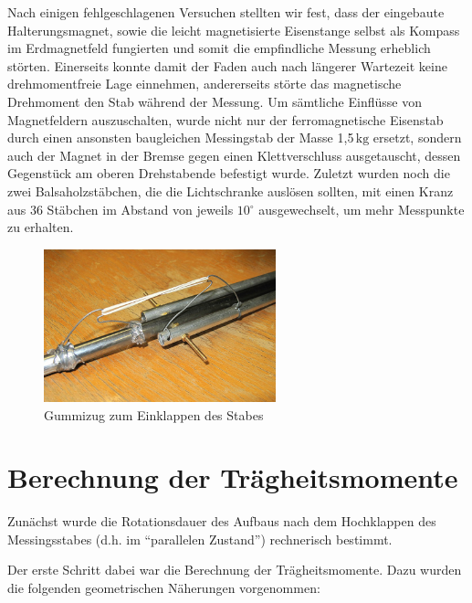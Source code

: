\documentclass[halfparskip, 11pt]{scrartcl}
\newcommand{\unit}[1]{\ensuremath{\,\mathrm{#1}}} %
\newcommand{\degr}{\ensuremath{^\circ}}
\begin{document}
Nach einigen fehlgeschlagenen Versuchen stellten wir fest, dass der eingebaute Halterungsmagnet, sowie die leicht magnetisierte Eisenstange selbst als Kompass im Erdmagnetfeld fungierten und somit die empfindliche Messung erheblich störten.
Einerseits konnte damit der Faden auch nach längerer Wartezeit keine drehmomentfreie Lage einnehmen, andererseits störte das magnetische Drehmoment den Stab während der Messung.
Um s\"amtliche Einfl\"usse von Magnetfeldern auszuschalten, wurde nicht nur der ferromagnetische Eisenstab durch einen ansonsten baugleichen Messingstab der Masse 1,5\unit{kg} ersetzt, sondern auch der Magnet in der Bremse gegen einen Klettverschluss ausgetauscht, dessen Gegenst\"uck am oberen Drehstabende befestigt wurde. Zuletzt wurden noch die zwei Balsaholzst\"abchen, die die Lichtschranke ausl\"osen sollten, mit einen Kranz aus 36 St\"abchen im Abstand von jeweils $10\degr$ ausgewechselt, um mehr Messpunkte zu erhalten.

\begin{figure}[ht]
\centering
\includegraphics[width=0.6\textwidth]{zugmechanismus.jpg}
\caption{Gummizug zum Einklappen des Stabes}
\label{zugmechanismus}
\end{figure}




\section{Berechnung der Trägheitsmomente} %

Zun\"achst wurde die Rotationsdauer des Aufbaus nach dem Hochklappen des Messingsstabes (d.h. im "`parallelen Zustand"') rechnerisch bestimmt. 

Der erste Schritt dabei war die Berechnung der Tr\"agheitsmomente. Dazu wurden die folgenden geometrischen N\"aherungen vorgenommen:
\end{document}
